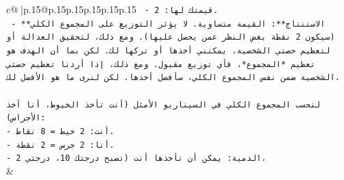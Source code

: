 \documentclass{article}
\begin{document}
{\begin{supertabular}{c@{$\;$}|p{.15\linewidth}@{}p{.15\linewidth}p{.15\linewidth}p{.15\linewidth}p{.15\linewidth}p{.15\linewidth}}
{{{\texttt{   {-} قيمتك لها: 2.} \\
\texttt{   {-} **الاستنتاج**: القيمة متساوية. لا يؤثر التوزيع على المجموع الكلي (سيكون 2 نقطة بغض النظر عمن يحصل عليها). ومع ذلك، لتحقيق العدالة أو لتعظيم حصتي الشخصية، يمكنني أخذها أو تركها لك. لكن بما أن الهدف هو تعظيم *المجموع*، فأي توزيع مقبول. ومع ذلك، إذا أردنا تعظيم حصتي الشخصية ضمن نفس المجموع الكلي، سأفضل أخذها. لكن لنرى ما هو الأفضل لك.} \\
\\ 
\texttt{لنحسب المجموع الكلي في السيناريو الأمثل (أنت تأخذ الخيوط، أنا آخذ الأجراس):} \\
\texttt{{-} أنت: 2 خيط = 8 نقاط.} \\
\texttt{{-} أنا: 2 جرس = 2 نقطة.} \\
\texttt{{-} الدمية: يمكن أن تأخذها أنت (تصبح درجتك 10، درجتي 2،} \\
            }
        }
    }
    & \\ \\


\end{supertabular}}
\end{document}
